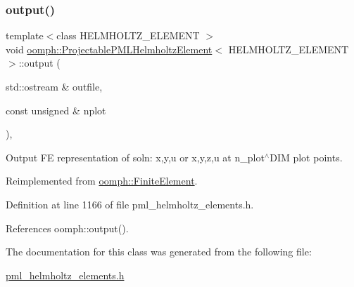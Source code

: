 \subsubsection{\texorpdfstring{output()}{output()}}
{\footnotesize\ttfamily template$<$class H\+E\+L\+M\+H\+O\+L\+T\+Z\+\_\+\+E\+L\+E\+M\+E\+NT $>$ \\
void \hyperlink{classoomph_1_1ProjectablePMLHelmholtzElement}{oomph\+::\+Projectable\+P\+M\+L\+Helmholtz\+Element}$<$ H\+E\+L\+M\+H\+O\+L\+T\+Z\+\_\+\+E\+L\+E\+M\+E\+NT $>$\+::output (\begin{DoxyParamCaption}\item[{std\+::ostream \&}]{outfile,  }\item[{const unsigned \&}]{nplot }\end{DoxyParamCaption})\hspace{0.3cm}{\ttfamily [inline]}, {\ttfamily [virtual]}}



Output FE representation of soln\+: x,y,u or x,y,z,u at n\+\_\+plot$^\wedge$\+D\+IM plot points. 



Reimplemented from \hyperlink{classoomph_1_1FiniteElement_afa9d9b2670f999b43e6679c9dd28c457}{oomph\+::\+Finite\+Element}.



Definition at line 1166 of file pml\+\_\+helmholtz\+\_\+elements.\+h.



References oomph\+::output().



The documentation for this class was generated from the following file\+:\begin{DoxyCompactItemize}
\item 
\hyperlink{pml__helmholtz__elements_8h}{pml\+\_\+helmholtz\+\_\+elements.\+h}\end{DoxyCompactItemize}
